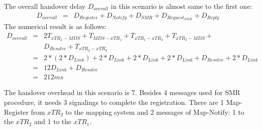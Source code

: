
The overall handover delay $D_{overall}$ in this scenario is almost same to the first one:
\begin{eqnarray}
D_{overall} &=& D_{Register} + D_{Notify} + D_{SMR} + D_{Request_{SMR}} + D_{Reply} 
\end{eqnarray}
The numerical result is as follows:
\begin{eqnarray}
D_{overall} &=& 2T_{xTR_2-MDS} + T_{MDS-xTR_1} + T_{xTR_1-xTR_3} + T_{xTR_3-MDS} + \nonumber \\
& & D_{Resolve} + T_{xTR_2-xTR_3} \nonumber \\
&=& 2* (2*D_{Link}) + 2*D_{Link} + 2*D_{Link} + 2*D_{Link} + D_{Resolve} + 2*D_{Link} \nonumber \\
&=& 12D_{Link} + D_{Resolve}  \nonumber \\
&=& 212 ms \nonumber
\end{eqnarray}

The handover overhead in this scenario is 7. Besides 4 messages used for SMR procedure, it needs 3 signalings to complete the registration. There are 1 Map-Register from $xTR_2$ to the mapping system and 2 messages of Map-Notify: 1 to the $xTR_2$ and 1 to the $xTR_1$.

